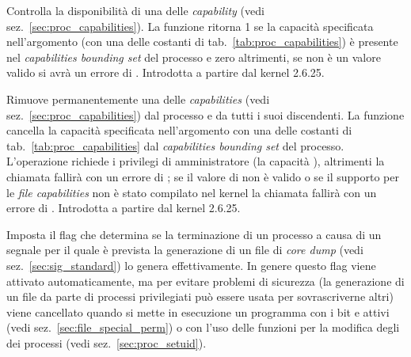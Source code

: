 
\begin{basedescript}{\desclabelwidth{1.5cm}\desclabelstyle{\nextlinelabel}}
\item[\constd{PR\_CAPBSET\_READ}] Controlla la disponibilità di una delle
  \textit{capability} (vedi sez.~\ref{sec:proc_capabilities}). La funzione
  ritorna 1 se la capacità specificata nell'argomento  (con una
  delle costanti di tab.~\ref{tab:proc_capabilities}) è presente nel
  \textit{capabilities bounding set} del processo e zero altrimenti,
  se  non è un valore valido si avrà un errore di .
  Introdotta a partire dal kernel 2.6.25.

\item[\constd{PR\_CAPBSET\_DROP}] Rimuove permanentemente una delle
  \textit{capabilities} (vedi sez.~\ref{sec:proc_capabilities}) dal processo e
  da tutti i suoi discendenti. La funzione cancella la capacità specificata
  nell'argomento  con una delle costanti di
  tab.~\ref{tab:proc_capabilities} dal \textit{capabilities bounding set} del
  processo. L'operazione richiede i privilegi di amministratore (la capacità
  ), altrimenti la chiamata fallirà con un errore di
  ; se il valore di  non è valido o se il supporto
  per le \textit{file capabilities} non è stato compilato nel kernel la
  chiamata fallirà con un errore di . Introdotta a partire dal
  kernel 2.6.25.

\item[\constd{PR\_SET\_DUMPABLE}] Imposta il flag che determina se la
  terminazione di un processo a causa di un segnale per il quale è prevista la
  generazione di un file di \textit{core dump} (vedi
  sez.~\ref{sec:sig_standard}) lo genera effettivamente. In genere questo flag
  viene attivato automaticamente, ma per evitare problemi di sicurezza (la
  generazione di un file da parte di processi privilegiati può essere usata
  per sovrascriverne altri) viene cancellato quando si mette in esecuzione un
  programma con i bit  e  attivi (vedi
  sez.~\ref{sec:file_special_perm}) o con l'uso delle funzioni per la modifica
  degli  dei processi (vedi sez.~\ref{sec:proc_setuid}).


\end{basedescript}
